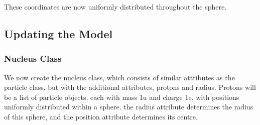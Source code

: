 \documentclass[11pt]{article}
\begin{document}
    These coordinates are now uniformly distributed throughout the sphere.

    \hypertarget{updating-the-model}{%
\subsection{Updating the Model}\label{updating-the-model}}

\hypertarget{nucleus-class}{%
\subsubsection{Nucleus Class}\label{nucleus-class}}

We now create the nucleus class, which consists of similar attributes as
the particle class, but with the additional attributes, protons and
radius. Protons will be a list of particle objects, each with mass 1u
and charge 1e, with positions uniformly distributed within a sphere. the
radius attribute determines the radius of this sphere, and the position
attribute determines its centre.
\end{document}
